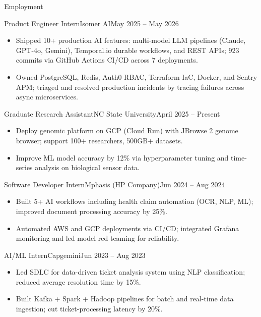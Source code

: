 \documentclass[]{mcdowellcv}
\begin{document}
\makeheader

\begin{cvsection}{Employment}
  \begin{cvsubsection}{Product Engineer Intern}{Isomer AI}{May 2025 -- May 2026}
    \begin{itemize}
      \item Shipped 10+ production AI features: multi-model LLM pipelines (Claude, GPT-4o, Gemini), Temporal.io durable workflows, and REST APIs; 923 commits via GitHub Actions CI/CD across 7 deployments.
      \item Owned PostgreSQL, Redis, Auth0 RBAC, Terraform IaC, Docker, and Sentry APM; triaged and resolved production incidents by tracing failures across async microservices.
    \end{itemize}
    \vspace{-1.5pt}
  \end{cvsubsection}

  \begin{cvsubsection}{Graduate Research Assistant}{NC State University}{April 2025 -- Present}
    \begin{itemize}
      \item Deploy genomic platform on GCP (Cloud Run) with JBrowse 2 genome browser; support 100+ researchers, 500GB+ datasets.
      \item Improve ML model accuracy by 12\% via hyperparameter tuning and time-series analysis on biological sensor data.
    \end{itemize}
    \vspace{-1.5pt}
  \end{cvsubsection}

  \begin{cvsubsection}{Software Developer Intern}{Mphasis (HP Company)}{Jun 2024 -- Aug 2024}
    \begin{itemize}
      \item Built 5+ AI workflows including health claim automation (OCR, NLP, ML); improved document processing accuracy by 25\%.
      \item Automated AWS and GCP deployments via CI/CD; integrated Grafana monitoring and led model red-teaming for reliability.
    \end{itemize}
    \vspace{-1.5pt}
  \end{cvsubsection}

  \begin{cvsubsection}{AI/ML Intern}{Capgemini}{Jun 2023 -- Aug 2023}
    \begin{itemize}
      \item Led SDLC for data-driven ticket analysis system using NLP classification; reduced average resolution time by 15\%.
      \item Built Kafka + Spark + Hadoop pipelines for batch and real-time data ingestion; cut ticket-processing latency by 20\%.
    \end{itemize}
    \vspace{-1.5pt}
  \end{cvsubsection}
\end{cvsection}
\end{document}
